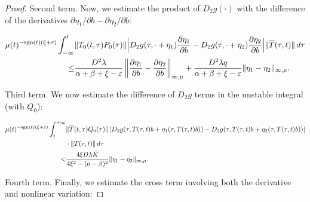 \documentclass[9pt]{amsart}
\numberwithin{equation}{section}
\numberwithin{lemma}{section}
\begin{document}
\begin{proof}
\medskip
\noindent
Second term. Now, we estimate the product of $D_2g(\cdot)$ with the difference of the derivatives $\partial\eta_1/\partial b - \partial\eta_2/\partial b$:

\begin{equation*}
\begin{split}
\mu(t)^{-\textnormal{sgn}(t)(\xi+\varepsilon)} \int_{-\infty}^{t} & \|T_0(t,\tau)P_0(\tau)\|
\Big| D_2g(\tau, \cdot + \eta_1) \frac{\partial\eta_1}{\partial b} - D_2g(\tau, \cdot + \eta_2) \frac{\partial\eta_2}{\partial b} \Big|
\|\overline{T}(\tau,t)\| \, d\tau
\\
\leq & \frac{D^2\lambda}{\alpha+\beta+\xi-\varepsilon} \left\| \frac{\partial\eta_1}{\partial b} - \frac{\partial\eta_2}{\partial b} \right\|_{\infty,\mu} + \frac{D^2\lambda q}{\alpha+\beta+\xi-\varepsilon} \|\eta_1 - \eta_2\|_{\infty,\mu}.
\end{split}
\end{equation*}

\medskip
\noindent
Third term. We now estimate the difference of $D_2g$ terms in the unstable integral (with $Q_0$):

\begin{equation*}
\begin{split}
\mu(t)^{-\textnormal{sgn}(t)(\xi+\varepsilon)} \int_{t}^{+\infty} & \|\overline{T}(t,\tau)Q_0(\tau)\|
\left| D_2g(\tau, T(\tau,t)b + \eta_1(\tau, T(\tau,t)b)) - D_2g(\tau, T(\tau,t)b + \eta_2(\tau, T(\tau,t)b)) \right| 
\\
& \cdot \|T(\tau,t)\| \, d\tau
\\
< & \frac{4\xi D\lambda \tilde{K}}{4\xi^2 - (a-\beta)^2} \|\eta_1 - \eta_2\|_{\infty,\mu}.
\end{split}
\end{equation*}

\medskip
\noindent
Fourth term. Finally, we estimate the cross term involving both the derivative and nonlinear variation:


\end{proof}
\end{document}
